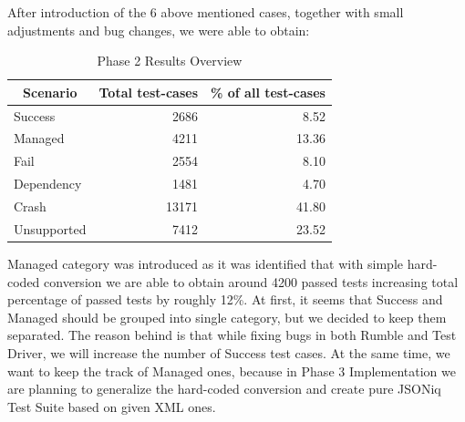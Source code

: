 After introduction of the 6 above mentioned cases, together with small adjustments and bug changes, we were able to obtain:
\begin{table}[h!]
	\centering
	\begin{tabular}{|l|r|r|}
		\hline
		\multicolumn{1}{|c|}{Scenario} & \multicolumn{1}{c|}{Total test-cases} & \multicolumn{1}{c|}{\% of all test-cases} \\ \hline
		Success                        & 2686                                  & 8.52                                      \\ \hline
		Managed                        & 4211                                  & 13.36                                     \\ \hline
		Fail                           & 2554                                  & 8.10                                      \\ \hline
		Dependency                     & 1481                                  & 4.70                                      \\ \hline
		Crash                          & 13171                                 & 41.80                                     \\ \hline
		Unsupported                    & 7412                                  & 23.52                                     \\ \hline
	\end{tabular}
	\caption{Phase 2 Results Overview}
	\label{tab:Phase2_ResultTable}
\end{table}

Managed category was introduced as it was identified that with simple hard-coded conversion we are able to obtain around 4200 passed tests increasing total percentage of passed tests by roughly 12\%. At first, it seems that Success and Managed should be grouped into single category, but we decided to keep them separated. The reason behind is that while fixing bugs in both Rumble and Test Driver, we will increase the number of Success test cases. At the same time, we want to keep the track of Managed ones, because in Phase 3 Implementation we are planning to generalize the hard-coded conversion and create pure JSONiq Test Suite based on given XML ones.

